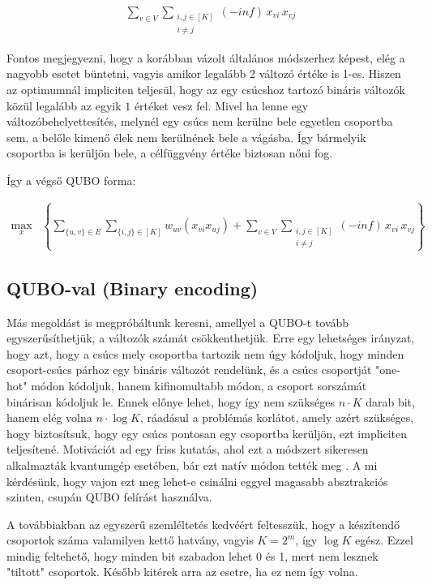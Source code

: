 \begin{align}
	\sum _{v \in V } \sum _{\substack{ i,j \in [K] \\  i \neq j}} (-inf) \, x_{vi} \, x_{vj} \label{QUBOOnehotonlyone}
\end{align}

Fontos megjegyezni, hogy a korábban vázolt általános módszerhez képest, elég a nagyobb esetet büntetni, vagyis amikor legalább 2 változó értéke is 1-es. Hiszen az optimumnál impliciten teljesül, hogy az egy csúcshoz tartozó bináris változók közül legalább az egyik $1$ értéket vesz fel. Mivel ha lenne egy változóbehelyettesítés, melynél egy csúcs nem kerülne bele egyetlen csoportba sem, a belőle kimenő élek nem kerülnének bele a vágásba. Így bármelyik csoportba is kerüljön bele, a célfüggvény értéke biztosan nőni fog.

Így a végső QUBO forma:

\begin{align} 
	\max_{x} & \left\{ \sum _{\{{u,v}\} \in E}  \sum _{\{{i,j}\} \in [K]} w_{uv}(x_{vi}  x_{uj}) + \sum _{v \in V } \sum _{\substack{ i,j \in [K] \\  i \neq j}} (-inf) \, x_{vi} \, x_{vj}\right\} 
\end{align}



\subsection{QUBO-val (Binary encoding)}\label{sec:QUBObinary}

Más megoldást is megpróbáltunk keresni, amellyel a QUBO-t tovább egyszerűsíthetjük, a változók számát csökkenthetjük. Erre egy lehetséges irányzat, hogy azt, hogy a csúcs mely csoportba tartozik nem úgy kódoljuk, hogy minden csoport-csúcs párhoz egy bináris változót rendelünk, és a csúcs csoportját "one-hot" módon kódoljuk, hanem kifinomultabb módon, a csoport sorszámát binárisan kódoljuk le. Ennek előnye lehet, hogy így nem szükséges $n \cdot K$ darab bit, hanem elég volna $n \cdot \log K$, ráadásul a problémás korlátot, amely azért szükséges, hogy biztosítsuk, hogy egy csúcs pontosan egy csoportba kerüljön, ezt impliciten teljesítené. Motivációt ad egy friss kutatás, ahol ezt a módszert sikeresen alkalmazták kvantumgép esetében, bár ezt natív módon tették meg  \cite{fuchs2020efficient}. A mi kérdésünk, hogy vajon ezt meg lehet-e csinálni eggyel magasabb absztrakciós szinten, csupán QUBO felírást használva.

A továbbiakban az egyszerű szemléltetés kedvéért feltesszük, hogy a készítendő csoportok száma valamilyen kettő hatvány, vagyis $K=2^m$, így $\log K$ egész. Ezzel mindig feltehető, hogy minden bit szabadon lehet 0 és 1, mert nem lesznek "tiltott" csoportok. Később kitérek arra az esetre, ha ez nem így volna.

